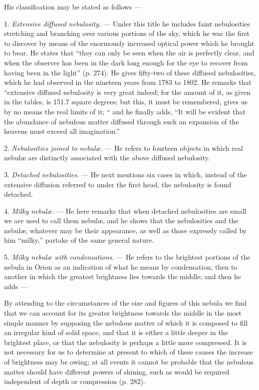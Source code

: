 \documentclass[a4paper, 12pt, oneside, polutonikogreek, english]{article}
\begin{document}
His classification may be stated as follows ---

1. \emph{Extensive diffused nebulosity.} --- Under this title he includes faint nebulosities stretching and branching over various portions of the sky, which he was the first to discover by means of the enormously increased optical power which he brought to bear. He states that ``they can only be seen when the air is perfectly clear, and when the observer has been in the dark long enough for the eye to recover from having been in the light'' (p. 274). He gives fifty-two of these diffused nebulosities, which he had observed in the nineteen years from 1783 to 1802. He remarks that ``extensive diffused nebulosity is very great indeed; for the amount of it, as given in the tables, is 151.7 square degrees; but this, it must be remembered, gives us by no means the real limits of it; `` and he finally adds, ``It will be evident that the abundance of nebulous matter diffused through such an expansion of the heavens must exceed all imagination.''

2. \emph{Nebulosities joined to nebulæ.} --- He refers to fourteen objects in which real nebulæ are distinctly associated with the above diffused nebulosity.

3. \emph{Detached nebulosities.} --- He next mentions six cases in which, instead of the extensive diffusion referred to under the first head, the nebulosity is found detached.

4. \emph{Milky nebulæ.} --- He here remarks that when detached nebulosities are small we are used to call them nebulæ, and he shows that the nebulosities and the nebulæ, whatever may be their appearance, as well as those expressly called by him ``milky,'' partake of the same general nature.

5. \emph{Milky nebulæ with condensations.} --- He refers to the brightest portions of the nebula in Orion as an indication of what he means by condensation; then to another in which the greatest brightness lies towards the middle; and then he adds ---

By attending to the circumstances of the size and figures of this nebula we find that we can account for its greater brightness towards the middle in the most simple manner by supposing the nebulous matter of which it is composed to fill an irregular kind of solid space, and that it is either a little deeper in the brightest place, or that the nebulosity is perhaps a little more compressed. It is not necessary for us to determine at present to which of these causes the increase of brightness may be owing; at all events it cannot be probable that the nebulous matter should have different powers of shining, such as would be required independent of depth or compression (p. 282).
\end{document}
